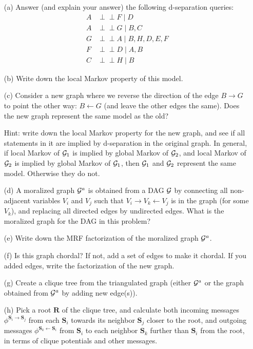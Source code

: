 \documentclass[11pt]{article}
\def\ci{\perp\!\!\!\perp}
\renewcommand{\vec}[1]{\mathbf{#1}}
\begin{document}
\begin{itemize}
\item[(a)] Answer (and explain your answer) the following d-separation queries:
\begin{align*}
A &\ci F \mid D \\
A &\ci G \mid B,C\\
G &\ci A \mid  B,H,D,E,F\\
F &\ci D \mid A,B\\
C &\ci H \mid B
\end{align*}

\item[(b)] Write down the local Markov property of this model.

\item[(c)] Consider a new graph where we reverse the direction of the edge $B \to G$ to point the other way: $B \gets G$ (and leave the other edges the same).  Does the new graph represent the same model as the old?

Hint: write down the local Markov property for the new graph, and see if all statements in it are implied by d-separation in the original graph.  In general, if local Markov of ${\cal G}_1$ is implied by global Markov of ${\cal G}_2$, and local Markov of ${\cal G}_2$ is implied by global Markov of ${\cal G}_1$, then ${\cal G}_1$ and ${\cal G}_2$ represent the same model.  Otherwise they do not.

\item[(d)] A moralized graph ${\cal G}^a$ is obtained from a DAG ${\cal G}$ by connecting all non-adjacent variables $V_i$ and $V_j$ such
that $V_i \to V_k \gets V_j$ is in the graph (for some $V_k$), and replacing all directed edges by undirected edges.
What is the moralized graph for the DAG in this problem?

\item[(e)] Write down the MRF factorization of the moralized graph ${\cal G}^a$.

\item[(f)] Is this graph chordal?  If not, add a set of edges to make it chordal.  If you added edges, write the factorization of the new graph.

\item[(g)] Create a clique tree from the triangulated graph (either ${\cal G}^a$ or the graph obtained from ${\cal G}^a$ by adding new edge(s)).

\item[(h)] Pick a root $\vec{R}$ of the clique tree, and calculate both incoming messages $\phi^{\vec{S}_i\to\vec{S}_j}$ from each
$\vec{S}_i$ towards its neighbor $\vec{S}_j$ closer to the root, and outgoing messages $\phi^{\vec{S}_k\gets\vec{S}_i}$ from $\vec{S}_i$ to each neighbor $\vec{S}_k$ further than $\vec{S}_i$ from the root, in terms of clique potentials and other messages.


\end{itemize}
\end{document}
